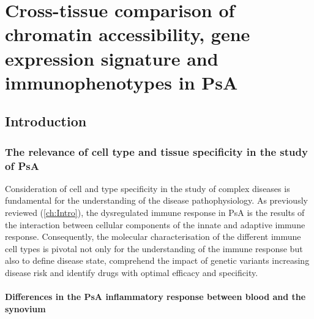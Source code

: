 \chapter{Cross-tissue comparison of chromatin accessibility, gene expression signature and immunophenotypes in PsA}
\label{ch:Results3}



\section{Introduction}

\subsection{The relevance of cell type and tissue specificity in the study of PsA}

Consideration of cell and type specificity in the study of complex diseases is fundamental for the understanding of the disease pathophysiology. As previously reviewed (\ref{ch:Intro}), the dysregulated immune response in PsA is the results of the interaction between cellular components of the innate and adaptive immune response. Consequently, the molecular characterisation of the different immune cell types is pivotal not only for the understanding of the immune response but also to define disease state, comprehend the impact of genetic variants increasing disease risk and identify drugs with optimal efficacy and specificity.


\subsubsection{Differences in the PsA inflammatory response between blood and the synovium}

